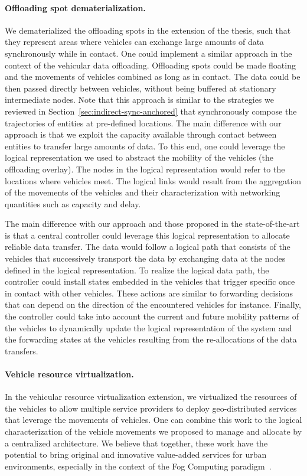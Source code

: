 \paragraph{Offloading spot dematerialization.}
We dematerialized the offloading spots in the extension of the thesis, such that they represent areas where vehicles can exchange large amounts of data synchronously while in contact. One could implement a similar approach in the context of the vehicular data offloading. Offloading spots could be made floating and the movements of vehicles combined as long as in contact. The data could be then passed directly between vehicles, \ie without being buffered at stationary intermediate nodes. Note that this approach is similar to the strategies we reviewed in Section~\ref{sec:indirect-sync-anchored} that synchronously compose the trajectories of entities at pre-defined locations. The main difference with our approach is that we exploit the capacity available through contact between entities to transfer large amounts of data. To this end, one could leverage the logical representation we used to abstract the mobility of the vehicles (\eg the offloading overlay). The nodes in the logical representation would refer to the locations where vehicles meet. The logical links would result from the aggregation of the movements of the vehicles and their characterization with networking quantities such as capacity and delay.

The main difference with our approach and those proposed in the state-of-the-art is that a central controller could leverage this logical representation to allocate reliable data transfer. The data would follow a logical path that consists of the vehicles that successively transport the data by exchanging data at the nodes defined in the logical representation. To realize the logical data path, the controller could install states embedded in the vehicles that trigger specific once in contact with other vehicles. These actions are similar to forwarding decisions that can depend  on the direction of the encountered vehicles for instance. Finally, the controller could take into account the current and future mobility patterns of the vehicles to dynamically update the logical representation of the system and the forwarding states at the vehicles resulting from the re-allocations of the data transfers.

\paragraph{Vehicle resource virtualization.} 
In the vehicular resource virtualization extension, we virtualized the resources of the vehicles to allow multiple service providers to deploy geo-distributed services that leverage the movements of vehicles. One can combine this work to the logical characterization of the vehicle movements we proposed to manage and allocate by a centralized architecture. We believe that together, these work have the potential to bring original and innovative value-added services for urban environments, especially in the context of the Fog Computing paradigm~\cite{bonomi2012fog}. 

